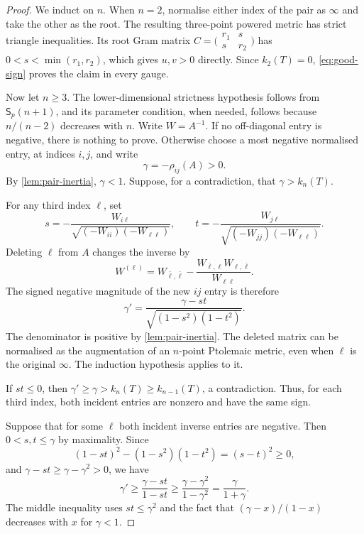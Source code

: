 \documentclass[11pt,a4paper]{article}
\theoremstyle{definition}
\theoremstyle{remark}
\numberwithin{equation}{section}
\newcommand{\stp}{\mathsf{S}_p}
\begin{document}
\begin{proof}
We induct on $n$. When $n=2$, normalise either index of the pair as $\infty$ and take the other as the root. The resulting three-point powered metric has strict triangle inequalities. Its root Gram matrix
$C=\bigl(\begin{smallmatrix}r_1&s\\s&r_2\end{smallmatrix}\bigr)$ has $0<s<\min(r_1,r_2)$, which gives $u,v>0$ directly. Since $k_2(T)=0$, \eqref{eq:good-sign} proves the claim in every gauge.

Now let $n\ge3$. The lower-dimensional strictness hypothesis follows from $\stp(n+1)$, and its parameter condition, when needed, follows because $n/(n-2)$ decreases with $n$. Write $W=A^{-1}$. If no off-diagonal entry is negative, there is nothing to prove. Otherwise choose a most negative normalised entry, at indices $i,j$, and write
\[
 \gamma=-\rho_{ij}(A)>0.
\]
By \cref{lem:pair-inertia}, $\gamma<1$. Suppose, for a contradiction, that $\gamma>k_n(T)$.

For any third index $\ell$, set
\[
 s=-\frac{W_{i\ell}}{\sqrt{(-W_{ii})(-W_{\ell\ell})}},\qquad
 t=-\frac{W_{j\ell}}{\sqrt{(-W_{jj})(-W_{\ell\ell})}}.
\]
Deleting $\ell$ from $A$ changes the inverse by
\begin{equation}\label{eq:inverse-deletion}
 W^{(\ell)}=W_{\bar\ell,\bar\ell}
 -\frac{W_{\bar\ell,\ell}W_{\ell,\bar\ell}}{W_{\ell\ell}}.
\end{equation}
The signed negative magnitude of the new $ij$ entry is therefore
\begin{equation}\label{eq:partial-correlation}
 \gamma'=\frac{\gamma-st}{\sqrt{(1-s^2)(1-t^2)}}.
\end{equation}
The denominator is positive by \cref{lem:pair-inertia}. The deleted matrix can be normalised as the augmentation of an $n$-point Ptolemaic metric, even when $\ell$ is the original $\infty$. The induction hypothesis applies to it.

If $st\le0$, then $\gamma'\ge\gamma>k_n(T)\ge k_{n-1}(T)$, a contradiction. Thus, for each third index, both incident entries are nonzero and have the same sign.

Suppose that for some $\ell$ both incident inverse entries are negative. Then $0<s,t\le\gamma$ by maximality. Since
\begin{equation}\label{eq:denominator}
 (1-st)^2-(1-s^2)(1-t^2)=(s-t)^2\ge0,
\end{equation}
and $\gamma-st\ge\gamma-\gamma^2>0$, we have
\begin{equation}\label{eq:gamma-step}
 \gamma'\ge\frac{\gamma-st}{1-st}
 \ge\frac{\gamma-\gamma^2}{1-\gamma^2}
 =\frac\gamma{1+\gamma}.
\end{equation}
The middle inequality uses $st\le\gamma^2$ and the fact that $(\gamma-x)/(1-x)$ decreases with $x$ for $\gamma<1$.


\end{proof}
\end{document}
